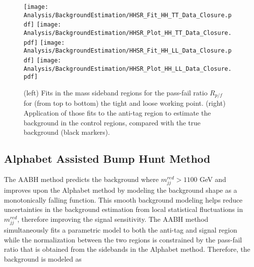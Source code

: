 \begin{figure}[h!]
\centering
\texttt{[image: Analysis/BackgroundEstimation/HHSR\_Fit\_HH\_TT\_Data\_Closure.pdf]}
\texttt{[image: Analysis/BackgroundEstimation/HHSR\_Plot\_HH\_TT\_Data\_Closure.pdf]}
\texttt{[image: Analysis/BackgroundEstimation/HHSR\_Fit\_HH\_LL\_Data\_Closure.pdf]}
\texttt{[image: Analysis/BackgroundEstimation/HHSR\_Plot\_HH\_LL\_Data\_Closure.pdf]}
\caption{(left) Fits in the mass sideband regions for the pass-fail ratio $R_{p/f}$ for (from top to bottom) the tight and loose working point. (right) Application of those fits to the anti-tag region to estimate the background in the control regions, compared with the true background (black markers).}
\label{F:closuredata}
\end{figure}




\subsection{Alphabet Assisted Bump Hunt Method}

The AABH method predicts the background where $m_{jj}^{red} > 1100$ GeV and improves upon the Alphabet method by modeling the background shape as a monotonically falling function. This smooth background modeling helps reduce uncertainties in the background estimation from local statistical fluctuations in $m_{jj}^{red}$, therefore improving the signal sensitivity. The AABH method simultaneously fits a parametric model to both the anti-tag and signal region while the normalization between the two regions is constrained by the pass-fail ratio that is obtained from the sidebands in the Alphabet method. Therefore, the background is modeled as


